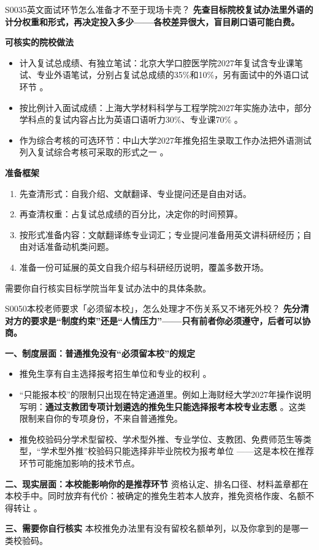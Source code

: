 \begin{qa}{S0035}{英文面试环节怎么准备才不至于现场卡壳？}
\textbf{先查目标院校复试办法里外语的计分权重和形式，再决定投入多少——各校差异很大，盲目刷口语可能白费。}

\textbf{可核实的院校做法}
\begin{itemize}
  \item 计入复试总成绩、有独立笔试：北京大学口腔医学院2027年复试含专业课笔试、专业外语笔试，分别占复试总成绩的35\%和10\%，另有面试中的外语口试环节 。
  \item 按比例计入面试成绩：上海大学材料科学与工程学院2027年实施办法中，部分学科点的复试内容占比为英语口语听力30\%、专业课70\% 。
  \item 作为综合考核的可选环节：中山大学2027年推免招生录取工作办法把外语测试列入复试综合考核可采取的形式之一 。
\end{itemize}

\textbf{准备框架}
\begin{enumerate}
  \item 先查清形式：自我介绍、文献翻译、专业提问还是自由对话。
  \item 再查清权重：占复试总成绩的百分比，决定你的时间预算。
  \item 按形式准备内容：文献翻译练专业词汇；专业提问准备用英文讲科研经历；自由对话准备动机类问题。
  \item 准备一份可延展的英文自我介绍与科研经历说明，覆盖多数开场。
\end{enumerate}

需要你自行核实目标学院当年复试办法中的具体条款。
\end{qa}

\begin{qa}{S0050}{本校老师要求「必须留本校」，怎么处理才不伤关系又不堵死外校？}
\textbf{先分清对方的要求是“制度约束”还是“人情压力”——只有前者你必须遵守，后者可以协商。}

\textbf{一、制度层面：普通推免没有“必须留本校”的规定}
\begin{itemize}
  \item 推免生享有自主选择报考招生单位和专业的权利 。
  \item “只能报本校”的限制只出现在特定通道里。例如上海财经大学2027年操作说明写明：\textbf{通过支教团专项计划遴选的推免生只能选择报考本校专业志愿} 。这类限制来自你的专项身份，不来自普通推免。
  \item 推免校验码分学术型留校、学术型外推、专业学位、支教团、免费师范生等类型，“学术型外推”校验码只能选择非毕业院校为报考单位 ——这是本校在推荐环节可能施加影响的技术节点。
\end{itemize}

\textbf{二、现实层面：本校能影响你的是推荐环节}
资格认定、排名口径、材料盖章都在本校手中。同时放弃有代价：被确定的推免生若本人放弃，推免资格作废、名额不得转让 。

\textbf{三、需要你自行核实}
本校推免办法里有没有留校名额单列，以及你拿到的是哪一类校验码。
\end{qa}

